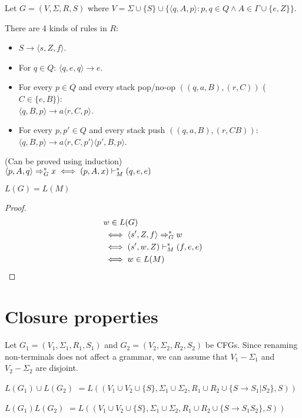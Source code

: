 Let $G = (V, \Sigma, R, S)$ where
$V = \Sigma \cup \{S\} \cup \{\langle q, A, p \rangle: p, q \in Q \wedge A \in \Gamma \cup \{e, Z\}\}$.

There are 4 kinds of rules in $R$:
\begin{itemize}
\item $S \rightarrow \langle s, Z, f \rangle$.
\item For $q \in Q$: $\langle q, e, q \rangle \rightarrow e$.
\item For every $p \in Q$ and every stack pop/no-op $((q,a,B), (r,C))$ ($C \in \{e, B\}$):\\
$\langle q, B, p \rangle \rightarrow a \langle r, C, p \rangle$.
\item For every $p, p' \in Q$ and every stack push $((q,a,B), (r,CB))$:\\
$\langle q, B, p \rangle \rightarrow a \langle r, C, p' \rangle \langle p', B, p \rangle$.
\end{itemize}

\begin{lemma}(Can be proved using induction)\\
$\langle p, A, q \rangle \Rightarrow_{G}^* x \iff (p, A, x) \vdash_M^* (q, e, e)$
\end{lemma}
\begin{theorem}$L(G) = L(M)$\end{theorem}
\begin{proof}
\begin{align*}
& w \in L(G)
\\ &\iff \langle s', Z, f \rangle \Rightarrow_{G}^* w
\\ &\iff (s', w, Z) \vdash_M^* (f, e, e)
\\ &\iff w \in L(M)
\end{align*}
\end{proof}

\section{Closure properties}

Let $G_1 = (V_1, \Sigma_1, R_1, S_1)$ and $G_2 = (V_2, \Sigma_2, R_2, S_2)$
be CFGs. Since renaming non-terminals does not affect a grammar,
we can assume that $V_1 - \Sigma_1$ and $V_2 - \Sigma_2$ are disjoint.

$L(G_1) \cup L(G_2)$
$= L((V_1 \cup V_2 \cup \{S\}, \Sigma_1 \cup \Sigma_2,
R_1 \cup R_2 \cup \{S \rightarrow S_1 | S_2 \}, S))$

$L(G_1)L(G_2)$
$= L((V_1 \cup V_2 \cup \{S\}, \Sigma_1 \cup \Sigma_2,
R_1 \cup R_2 \cup \{S \rightarrow S_1S_2 \}, S))$

